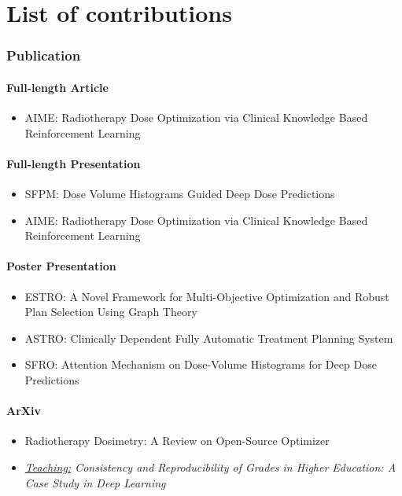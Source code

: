 \chapter*{List of contributions}
\subsection*{Publication}
\subsubsection*{Full-length Article}
\begin{itemize}
	\item AIME: Radiotherapy Dose Optimization via Clinical Knowledge Based Reinforcement Learning
\end{itemize}

\subsubsection*{Full-length Presentation}
\begin{itemize}
	\item SFPM: Dose Volume Histograms Guided Deep Dose Predictions
	\item AIME: Radiotherapy Dose Optimization via Clinical Knowledge Based Reinforcement Learning
\end{itemize}

\subsubsection*{Poster Presentation}
\begin{itemize}
	\item ESTRO: A Novel Framework for Multi-Objective Optimization and Robust Plan Selection Using Graph Theory
	\item ASTRO: Clinically Dependent Fully Automatic Treatment Planning System
	\item SFRO: Attention Mechanism on Dose-Volume Histograms for Deep Dose Predictions
\end{itemize}

\subsubsection*{ArXiv}
\begin{itemize}
	\item Radiotherapy Dosimetry: A Review on Open-Source Optimizer
	\item \textit{\underline{Teaching:} Consistency and Reproducibility of Grades in Higher Education: A Case Study in Deep Learning}
\end{itemize}


